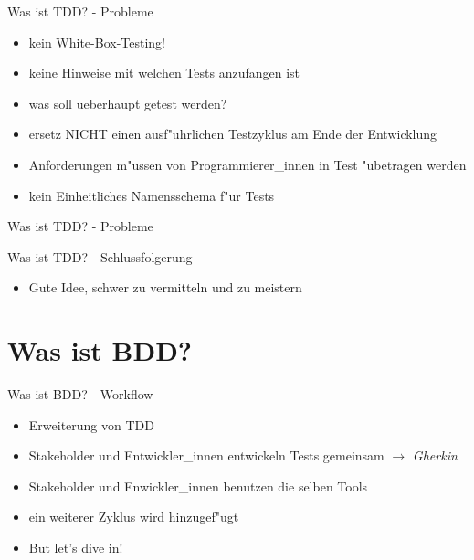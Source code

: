 \documentclass{beamer}
\begin{document}
  \begin{frame}{Was ist TDD? - Probleme}
    \begin{itemize}
      \item kein White-Box-Testing!
      \item keine Hinweise mit welchen Tests anzufangen ist
      \item was soll ueberhaupt getest werden?
      \item ersetz NICHT einen ausf"uhrlichen Testzyklus am Ende der Entwicklung
      \item Anforderungen m"ussen von Programmierer\_innen in Test "ubetragen werden
      \item kein Einheitliches Namensschema f"ur Tests
    \end{itemize}
  \end{frame}

  \begin{frame}{Was ist TDD? - Probleme}
    
  \end{frame}

  \begin{frame}{Was ist TDD? - Schlussfolgerung}
    \begin{itemize}
      \item Gute Idee, schwer zu vermitteln und zu meistern
    \end{itemize}
  \end{frame}


\section{Was ist BDD?}
  \begin{frame}{Was ist BDD? - Workflow}
    \begin{itemize}
      \item Erweiterung von TDD
      \item Stakeholder und Entwickler\_innen entwickeln Tests gemeinsam \( \rightarrow \) {\em Gherkin}
      \item Stakeholder und Enwickler\_innen benutzen die selben Tools
      \item ein weiterer Zyklus wird hinzugef"ugt
      \item But let's dive in!
    \end{itemize}
  \end{frame}
\end{document}
